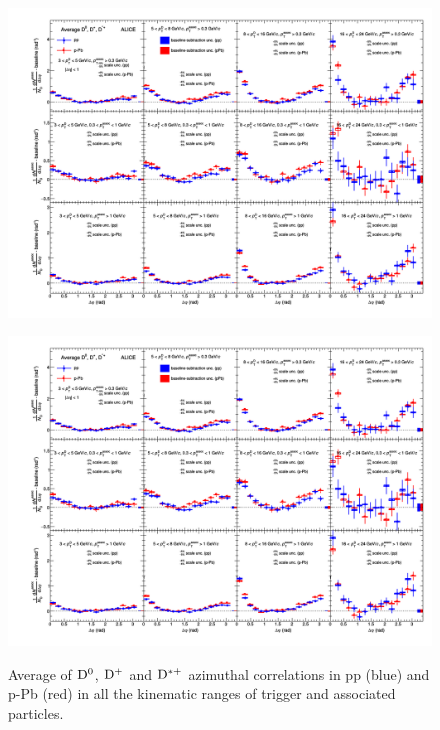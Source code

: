 \begin{figure}
\centering
\includegraphics[width=1.3\textwidth, angle=90]{figures/CfrPPandModels/plotComparison_WeightedAverage_pp_pPb_UniqueCanvas_Style1_1.png}
\end{figure}
\begin{figure}
\centering
\includegraphics[width=1.3\textwidth, angle=90]{figures/CfrPPandModels/plotComparison_WeightedAverage_pp_pPb_UniqueCanvas_Style1_1.png} \\

\caption{Average of ${\rm D^0}$, ${\rm D^+}$ and ${\rm D^{*+}}$ azimuthal correlations in pp (blue) and p-Pb (red) in all the kinematic ranges of trigger and associated particles.}
\label{fig:pp-pPb}
\end{figure}

